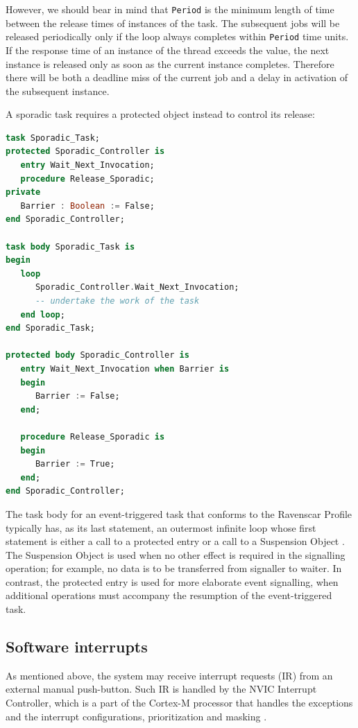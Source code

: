 \documentclass{article}
\begin{document}
However, we should bear in mind that \texttt{Period} is the minimum length of time between the release times of instances of the task. The subsequent jobs will be released periodically only if the loop always completes within \texttt{Period} time units. If the response time of an instance of the thread exceeds the value, the next instance is released only as soon as the current instance completes. Therefore there will be both a deadline miss of the current job and a delay in activation of the subsequent instance.

A sporadic task requires a protected object instead to control its release:

\begin{lstlisting}[language=Ada]
task Sporadic_Task;
protected Sporadic_Controller is
   entry Wait_Next_Invocation;
   procedure Release_Sporadic;
private
   Barrier : Boolean := False;
end Sporadic_Controller;

task body Sporadic_Task is
begin
   loop
      Sporadic_Controller.Wait_Next_Invocation;
      -- undertake the work of the task
   end loop;
end Sporadic_Task;

protected body Sporadic_Controller is
   entry Wait_Next_Invocation when Barrier is
   begin
      Barrier := False;
   end;

   procedure Release_Sporadic is
   begin
      Barrier := True;
   end;
end Sporadic_Controller;
\end{lstlisting}

The task body for an event-triggered task that conforms to the Ravenscar Profile typically has, as its last statement, an outermost infinite loop whose first statement is either a call to a protected entry or a call to a Suspension Object \cite{ycs}. The Suspension Object is used when no other effect is required in the signalling operation; for example, no data is to be transferred from signaller to waiter. In contrast, the protected entry is used for more elaborate event signalling, when additional operations must accompany the resumption of the event-triggered task.

\subsection{Software interrupts}
As mentioned above, the system may receive interrupt requests (IR) from an external manual push-button. Such IR is handled by the NVIC Interrupt Controller, which is a part of the Cortex-M processor that handles the exceptions and the interrupt configurations, prioritization and masking \cite{arm}.
\end{document}
